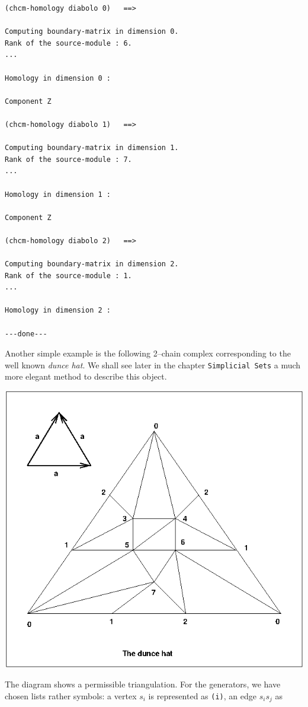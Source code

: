 {\footnotesize\begin{verbatim}
(chcm-homology diabolo 0)   ==>

Computing boundary-matrix in dimension 0.
Rank of the source-module : 6.
...

Homology in dimension 0 :

Component Z

(chcm-homology diabolo 1)   ==>

Computing boundary-matrix in dimension 1.
Rank of the source-module : 7.
...

Homology in dimension 1 :

Component Z

(chcm-homology diabolo 2)   ==>

Computing boundary-matrix in dimension 2.
Rank of the source-module : 1.
...

Homology in dimension 2 :

---done---
\end{verbatim}}
Another simple example is the following  2--chain  complex  corresponding to the
well known {\em dunce hat}. We shall see later in the chapter {\tt Simplicial Sets} a
much more elegant method to describe this object.
%
\vskip 0.40cm
\centerline{\includegraphics{dunce.eps}}
\vskip 0.40cm
%
The diagram shows a permissible triangulation. For the generators, we have  chosen lists 
rather symbols: a vertex $s_i$ is represented as {\tt (i)}, an edge $s_is_j$ as
